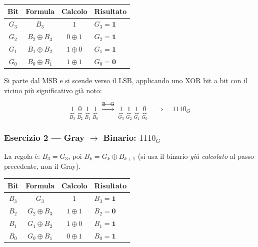 \documentclass[11pt,a4paper]{report}
\begin{document}
\medskip
\begin{center}
\begin{tabular}{c|c|c|l}
\toprule
Bit & Formula & Calcolo & Risultato\\
\midrule
$G_3$ & $B_3$ & $1$ & $G_3 = \mathbf{1}$ \\
$G_2$ & $B_2 \oplus B_3$ & $0 \oplus 1$ & $G_2 = \mathbf{1}$ \\
$G_1$ & $B_1 \oplus B_2$ & $1 \oplus 0$ & $G_1 = \mathbf{1}$ \\
$G_0$ & $B_0 \oplus B_1$ & $1 \oplus 1$ & $G_0 = \mathbf{0}$ \\
\bottomrule
\end{tabular}
\end{center}

\medskip
\noindent Si parte dal MSB e si scende verso il LSB, applicando uno XOR bit a bit con il vicino più significativo già noto:

\[
\underbrace{1}_{B_3}\;\underbrace{0}_{B_2}\;\underbrace{1}_{B_1}\;\underbrace{1}_{B_0}
\;\xrightarrow{\text{B}\to\text{G}}\;
\underbrace{1}_{G_3}\;\underbrace{1}_{G_2}\;\underbrace{1}_{G_1}\;\underbrace{0}_{G_0}
\quad\Rightarrow\quad \boxed{1110_G}
\]

\vspace{1.5em}

\subsubsection*{Esercizio 2 — Gray $\to$ Binario: \quad $1110_G$}

La regola è: $B_3 = G_3$, poi $B_k = G_k \oplus B_{k+1}$ (si usa il binario \emph{già calcolato} al passo precedente, non il Gray).

\medskip
\begin{center}
\begin{tabular}{c|c|c|l}
\toprule
Bit & Formula & Calcolo & Risultato\\
\midrule
$B_3$ & $G_3$ & $1$ & $B_3 = \mathbf{1}$ \\
$B_2$ & $G_2 \oplus B_3$ & $1 \oplus 1$ & $B_2 = \mathbf{0}$ \\
$B_1$ & $G_1 \oplus B_2$ & $1 \oplus 0$ & $B_1 = \mathbf{1}$ \\
$B_0$ & $G_0 \oplus B_1$ & $0 \oplus 1$ & $B_0 = \mathbf{1}$ \\
\bottomrule
\end{tabular}
\end{center}
\end{document}
